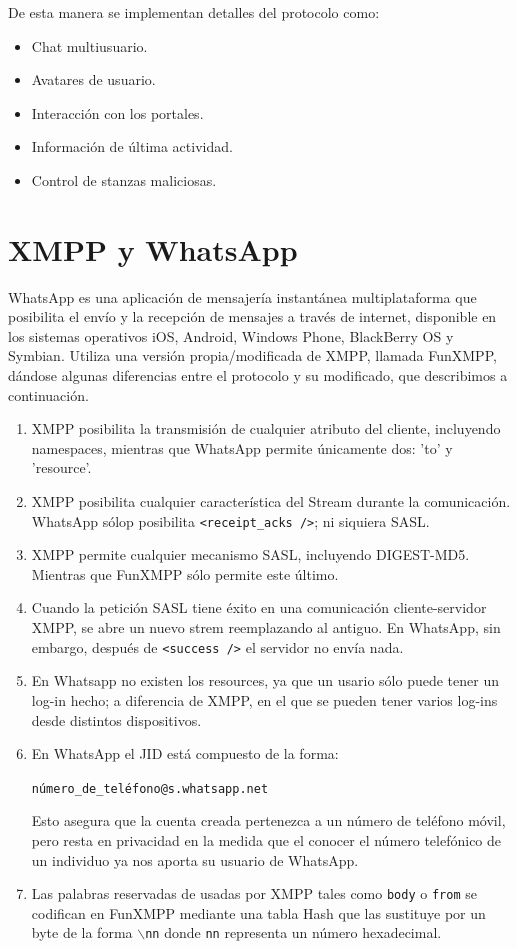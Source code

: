 \documentclass[a4paper, 11pt]{article} %
\begin{document}
    De esta manera se implementan detalles del protocolo como:
    \begin{itemize}
     \item Chat multiusuario.
     \item Avatares de usuario.
     \item Interacción con los portales.
     \item Información de última actividad.
     \item Control de stanzas maliciosas.
    \end{itemize}

\section{XMPP y WhatsApp}
  WhatsApp es una aplicación de mensajería instantánea multiplataforma que posibilita el envío y la recepción de mensajes a 
  través de internet, disponible en los sistemas operativos iOS, Android, Windows Phone, BlackBerry OS y Symbian. Utiliza una
  versión propia/modificada de XMPP, llamada FunXMPP, dándose algunas diferencias entre el protocolo y su modificado, que
  describimos a continuación.

  \begin{enumerate}
    \item XMPP posibilita la transmisión de cualquier atributo del cliente, incluyendo namespaces, mientras que WhatsApp
      permite únicamente dos: 'to' y 'resource'. %
    \item XMPP posibilita cualquier característica del Stream durante la comunicación. 
      WhatsApp sólop posibilita \texttt{<receipt\_acks />}; ni siquiera SASL.
    \item XMPP permite cualquier mecanismo SASL, incluyendo DIGEST-MD5. Mientras que FunXMPP sólo permite este último.
    \item Cuando la petición SASL tiene éxito en una comunicación cliente-servidor XMPP, se abre un nuevo strem reemplazando al antiguo.
      En WhatsApp, sin embargo, después de \texttt{<success />} el servidor no envía nada.
    \item En Whatsapp no existen los resources, ya que un usario sólo puede tener un log-in hecho; a diferencia de XMPP, en
      el que se pueden tener varios log-ins desde distintos dispositivos.
    \item En WhatsApp el JID está compuesto de la forma:
      \begin{center}
	\texttt{número\_de\_teléfono@s.whatsapp.net}
      \end{center}
      Esto asegura que la cuenta creada pertenezca a un número de teléfono móvil, pero resta en privacidad en la medida
      que el conocer el número telefónico de un individuo ya nos aporta su usuario de WhatsApp.
    \item Las palabras reservadas de usadas por XMPP tales como \texttt{body} o \texttt{from} se codifican en FunXMPP mediante
      una tabla Hash que las sustituye por un byte de la forma $\backslash$\texttt{nn} donde \texttt{nn} representa un número
      hexadecimal.
  \end{enumerate}
\end{document}
